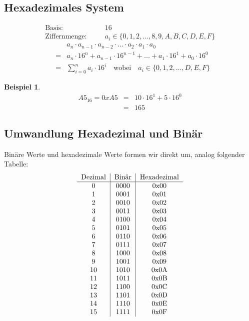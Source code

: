 \documentclass{report}
\newtheorem{myexample}{Beispiel}
\begin{document}
\subsection{Hexadezimales System}
\begin{eqnarray}\mbox{Basis}:&\quad& 16 \nonumber \\
\mbox{Ziffernmenge}:&\quad&a_i \in \{0, 1, 2, ..., 8, 9, A, B, C, D, E, F\}\end{eqnarray}
\begin{eqnarray}&&a_n \cdot a_{n-1} \cdot a_{n-2} \cdot ... \cdot a_2 \cdot a_1 \cdot a_0 \nonumber \\
&=&a_n \cdot 16^n + a_{n-1} \cdot 16^{n-1} + ... + a_1 \cdot 16^1 + a_0 \cdot 16^0 \nonumber \\
&=&\sum_{i=0}^{n} a_i \cdot 16^i \quad \mbox{wobei}\quad a_i \in \{0, 1, 2, ..., D, E, F\}\end{eqnarray}
\begin{myexample}
\begin{eqnarray}A5_{16} = 0xA5&=&10 \cdot 16^1 + 5 \cdot 16^0 \nonumber \\
&=&165\end{eqnarray}\end{myexample}
\subsection{Umwandlung Hexadezimal und Binär}
Binäre Werte und hexadezimale Werte formen wir direkt um, analog folgender Tabelle:\begin{equation}\begin{tabular}{c | c | c}
Dezimal & Binär & Hexadezimal\\
\hline
0 & 0000 & 0x00\\
1 & 0001 & 0x01\\
2 & 0010 & 0x02\\
3 & 0011 & 0x03\\
4 & 0100 & 0x04\\
5 & 0101 & 0x05\\
6 & 0110 & 0x06\\
7 & 0111 & 0x07\\
8 & 1000 & 0x08\\
9 & 1001 & 0x09\\
10 & 1010 & 0x0A\\
11 & 1011 & 0x0B\\
12 & 1100 & 0x0C\\
13 & 1101 & 0x0D\\
14 & 1110 & 0x0E\\
15 & 1111 & 0x0F\\
\end{tabular}\end{equation}
\end{document}
